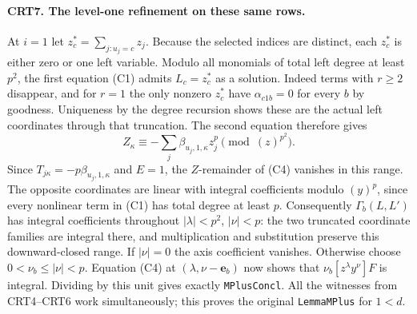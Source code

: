 \paragraph{CRT7. The level-one refinement on these same rows.}
At $i=1$ let $z_c^*=\sum_{j:u_j=c}z_j$. Because the selected
indices are distinct, each $z_c^*$ is either zero or one left
variable. Modulo all monomials of total left degree at least $p^2$,
the first equation (C1) admits $L_c=z_c^*$ as a solution.
Indeed terms with $r\ge2$ disappear, and for $r=1$ the only
nonzero $z_c^*$ have $\alpha_{c1b}=0$ for every $b$ by goodness.
Uniqueness by the degree recursion shows these are the actual left
coordinates through that truncation. The second equation therefore gives
\[
 Z_\kappa\equiv-\sum_j\beta_{u_j,1,\kappa} z_j^p
                              \pmod{(z)^{p^2}}.
\]
Since $T_{j\kappa}=-p\beta_{u_j,1,\kappa}$ and $E=1$, the
$Z$-remainder of (C4) vanishes in this range. The opposite
coordinates are linear with integral coefficients modulo $(y)^p$,
since every nonlinear term in (C1) has total degree at least $p$.
Consequently $\Gamma_b(L,L')$ has integral coefficients throughout
$|\lambda|<p^2$, $|\nu|<p$: the two truncated coordinate families
are integral there, and multiplication and substitution preserve this
downward-closed range. If $|\nu|=0$ the axis coefficient vanishes.
Otherwise choose $0<\nu_b\le|\nu|<p$. Equation (C4) at
$(\lambda,\nu-\mathbf e_b)$ now shows that
$\nu_b [z^\lambda y^\nu]F$ is integral. Dividing by this unit gives
exactly \texttt{MPlusConcl}. All the witnesses from CRT4--CRT6
work simultaneously; this proves the original \texttt{LemmaMPlus}
for $1<d$.

